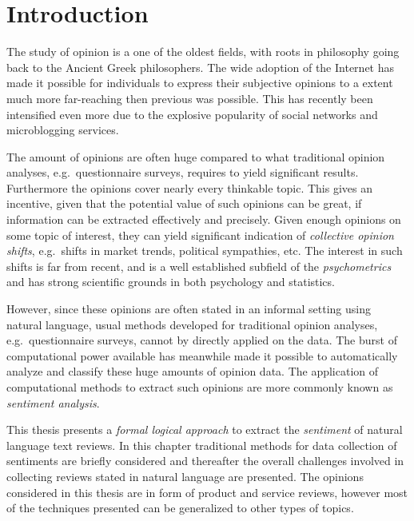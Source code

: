 
\chapter{Introduction}
The study of opinion is a one of the oldest fields, with roots in philosophy going back to the Ancient Greek philosophers. The wide adoption of the Internet has made it possible for individuals to express their subjective opinions to a extent much more far-reaching then previous was possible. This has recently been intensified even more due to the explosive popularity of social networks and microblogging services. 

The amount of opinions are often huge compared to what traditional opinion analyses, e.g.\ questionnaire surveys, requires to yield significant results. Furthermore the opinions cover nearly every thinkable topic. This gives an incentive, given that the potential value of such opinions can be great, if information can be extracted effectively and precisely. Given enough opinions on some topic of interest, they can yield significant indication of \emph{collective opinion shifts}, e.g.\ shifts in market trends, political sympathies, etc. 
The interest in such shifts is far from recent, and is a well established subfield of the \emph{psychometrics} and has strong scientific grounds in both psychology and statistics. 

However, since these opinions are often stated in an informal setting using natural language, usual methods developed for traditional opinion analyses, e.g.\ questionnaire surveys, cannot by directly applied on the data. The burst of computational power available has meanwhile made it possible to automatically analyze and classify these huge amounts of opinion data. The application of computational methods to extract such opinions are more commonly known as \emph{sentiment analysis}.

This thesis presents a \emph{formal logical approach} to extract the \emph{sentiment} of natural language text reviews. In this chapter traditional methods for data collection of sentiments are briefly considered and thereafter the overall challenges involved in collecting reviews stated in natural language are presented. The opinions considered in this thesis are in form of product and service reviews, however most of the techniques presented can be generalized to other types of topics.

